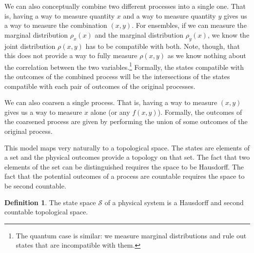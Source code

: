 \documentclass[aps,pra,10pt,twocolumn,floatfix,nofootinbib]{revtex4-1}
\theoremstyle{definition}
\newtheorem{defn}[prop]{Definition}
\begin{document}
We can also conceptually combine two different processes into a single one. That is, having a way to measure quantity $x$ and a way to measure quantity $y$ gives us a way to measure the combination $(x,y)$. For ensembles, if we can measure the marginal distribution $\rho_x(x)$ and the marginal distribution $\rho_y(x)$, we know the joint distribution $\rho(x,y)$ has to be compatible with both. Note, though, that this does not provide a way to fully measure $\rho(x,y)$ as we know nothing about the correlation between the two variables.\footnote{The quantum case is similar: we measure marginal distributions and rule out states that are incompatible with them.} Formally, the states compatible with the outcomes of the combined process will be the intersections of the states compatible with each pair of outcomes of the original processes.

We can also coarsen a single process. That is, having a way to measure $(x,y)$ gives us a way to measure $x$ alone (or any $f(x,y)$). Formally, the outcomes of the coarsened process are given by performing the union of some outcomes of the original process.

This model maps very naturally to a topological space. The states are elements of a set and the physical outcomes provide a topology on that set. The fact that two elements of the set can be distinguished requires the space to be Hausdorff. The fact that the potential outcomes of a process are countable requires the space to be second countable.

\begin{defn}\label{statedef}
The state space $\mathcal{S}$ of a physical system is a Hausdorff and second countable topological space.
\end{defn}
\end{document}
